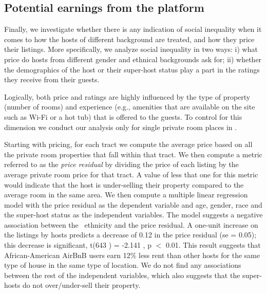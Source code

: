 \subsection{Potential earnings from the platform}


Finally, we investigate whether there is any indication of social inequality when it comes to how the hosts of different background are treated, and how they price their listings. More specifically, we analyze social inequality in two ways:  i) what price do hosts from different  gender and ethnical backgrounds ask for; ii) whether the demographics of the host or their super-host status play a part in the ratings they receive from their guests.

Logically, both price and ratings are highly influenced by the type of property (number of rooms) and experience (e.g., amenities that are available on the site such as Wi-Fi or a hot tub) that is offered to the guests. To control for this dimension we conduct our analysis only for single private room places in \ab. %

Starting with pricing, for each tract we compute the average price based on all the private room properties that fall within that tract. We then compute a metric referred to as the \emph{price residual} by dividing the price of each listing by the average private room price for that tract. A value of less that one for this metric would indicate that the host is under-selling their property compared to the average room in the same area. We then compute a multiple linear regression model with the price residual as the dependent variable  and age, gender,  race and the super-host status as the independent variables. The model suggests a negative association between the \aam \ ethnicity and the price residual. A one-unit increase on the listings by \aam hosts predicts a decrease  of 0.12  in the  price residual  (se = 0.05); this decrease is significant, t(643 ) = -2.141 , p $<$ 0.01.  This result suggests that African-American AirBnB users earn 12\% less rent than other hosts for the same type of house in the same type of location. We do not find any  associations between the rest of the independent variables, which also suggests that the super-hosts do not over/under-sell their property. 


